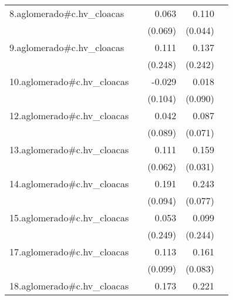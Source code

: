 {\begin{longtable}{l*{4}{D{.}{.}{-1}}}
\addlinespace
8.aglomerado#c.hv\_cloacas&                     &       0.063         &       0.110\sym{*}  &                     \\
            &                     &     (0.069)         &     (0.044)         &                     \\
\addlinespace
9.aglomerado#c.hv\_cloacas&                     &       0.111         &       0.137         &                     \\
            &                     &     (0.248)         &     (0.242)         &                     \\
\addlinespace
10.aglomerado#c.hv\_cloacas&                     &      -0.029         &       0.018         &                     \\
            &                     &     (0.104)         &     (0.090)         &                     \\
\addlinespace
12.aglomerado#c.hv\_cloacas&                     &       0.042         &       0.087         &                     \\
            &                     &     (0.089)         &     (0.071)         &                     \\
\addlinespace
13.aglomerado#c.hv\_cloacas&                     &       0.111         &       0.159\sym{***}&                     \\
            &                     &     (0.062)         &     (0.031)         &                     \\
\addlinespace
14.aglomerado#c.hv\_cloacas&                     &       0.191\sym{*}  &       0.243\sym{**} &                     \\
            &                     &     (0.094)         &     (0.077)         &                     \\
\addlinespace
15.aglomerado#c.hv\_cloacas&                     &       0.053         &       0.099         &                     \\
            &                     &     (0.249)         &     (0.244)         &                     \\
\addlinespace
17.aglomerado#c.hv\_cloacas&                     &       0.113         &       0.161         &                     \\
            &                     &     (0.099)         &     (0.083)         &                     \\
\addlinespace
18.aglomerado#c.hv\_cloacas&                     &       0.173\sym{**} &       0.221\sym{***}&                     \\

\end{longtable}}
